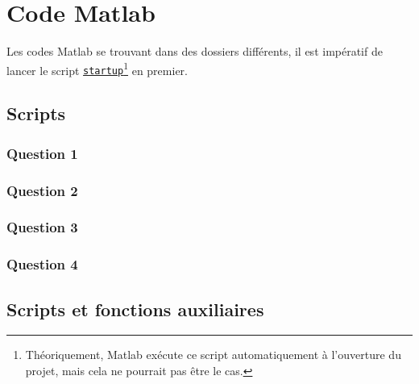 \documentclass[a4paper, 12pt]{article}
\begin{document}
	
	\section*{Code Matlab}
	Les codes Matlab se trouvant dans des dossiers différents, il est impératif de lancer le script \hyperref[subsec:code-auxiliary]{\texttt{startup}}\footnote{Théoriquement, Matlab exécute ce script automatiquement à l'ouverture du projet, mais cela ne pourrait pas être le cas.} en premier.
	
	\subsection*{Scripts}
	
	\subsubsection*{Question 1}
	\label{subsec:code-Q1}
	
	
	
	
	
	
	
	\subsubsection*{Question 2}
	\label{subsec:code-Q2}
	
	
	
	\subsubsection*{Question 3}
	\label{subsec:code-Q3}
	
	
	
	\subsubsection*{Question 4}
	\label{subsec:code-Q4}
	
	
	\subsection*{Scripts et fonctions auxiliaires}
	\label{subsec:code-auxiliary}
	
	
	
\end{document}
